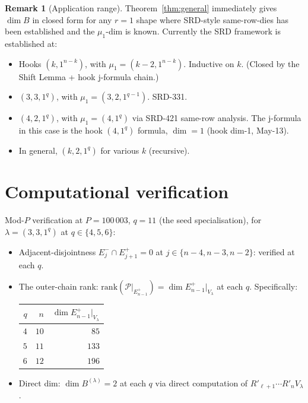 \documentclass[11pt]{article}
\theoremstyle{definition}
\newtheorem{remark}[theorem]{Remark}
\begin{document}
\begin{remark}[Application range]\label{rem:range}
Theorem~\ref{thm:general} immediately gives $\dim B$ in closed form
for any $r = 1$ shape where SRD-style same-row-dies has been
established and the $\mu_1$-dim is known. Currently the SRD framework
is established at:
\begin{itemize}[leftmargin=2em,topsep=0.2em,itemsep=0.1em]
\item Hooks $(k, 1^{n-k})$, with $\mu_1 = (k - 2, 1^{n-k})$. Inductive
on $k$. (Closed by the Shift Lemma + hook j-formula chain.)
\item $(3, 3, 1^q)$, with $\mu_1 = (3, 2, 1^{q-1})$. SRD-331.
\item $(4, 2, 1^q)$, with $\mu_1 = (4, 1^{q})$ via SRD-421 same-row
analysis. The j-formula in this case is the hook $(4, 1^q)$ formula,
$\dim = 1$ (hook dim-1, May-13).
\item In general, $(k, 2, 1^q)$ for various $k$ (recursive).
\end{itemize}
\end{remark}

\section{Computational verification}\label{sec:comp}

Mod-$P$ verification at $P = 100\,003$, $q = 11$ (the seed
specialisation), for $\lambda = (3, 3, 1^q)$ at
$q \in \{4, 5, 6\}$:

\begin{itemize}[leftmargin=2em,topsep=0.3em,itemsep=0.2em]
\item Adjacent-disjointness $E_j^- \cap E_{j+1}^+ = 0$ at
$j \in \{n-4, n-3, n-2\}$: verified at each $q$.
\item The outer-chain rank: $\mathrm{rank}(\mathcal{P}\big|_{E_{n-1}^+})
= \dim E_{n-1}^+|_{V_\lambda}$ at each $q$. Specifically:
\begin{center}
\begin{tabular}{rrr}
$q$ & $n$ & $\dim E_{n-1}^+|_{V_\lambda}$ \\
\hline
$4$ & $10$ & $85$ \\
$5$ & $11$ & $133$ \\
$6$ & $12$ & $196$
\end{tabular}
\end{center}
\item Direct dim: $\dim B^{(\lambda)} = 2$ at each $q$ via direct
computation of $R'_{\ell+1}\cdots R'_n V_\lambda$.
\end{itemize}
\end{document}

